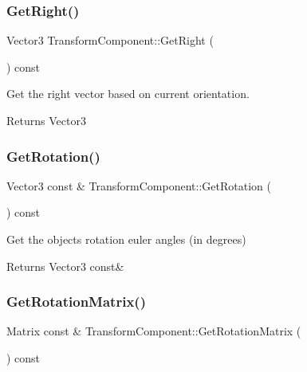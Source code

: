 \subsubsection{\texorpdfstring{Get\+Right()}{GetRight()}}
{\footnotesize\ttfamily Vector3 Transform\+Component\+::\+Get\+Right (\begin{DoxyParamCaption}{ }\end{DoxyParamCaption}) const}



Get the right vector based on current orientation. 

\begin{DoxyReturn}{Returns}
Vector3 
\end{DoxyReturn}
\mbox{\label{classTransformComponent_a66072d2fe63c96e8cded35fca0579400}} 
\subsubsection{\texorpdfstring{Get\+Rotation()}{GetRotation()}}
{\footnotesize\ttfamily Vector3 const  \& Transform\+Component\+::\+Get\+Rotation (\begin{DoxyParamCaption}{ }\end{DoxyParamCaption}) const}



Get the object\textquotesingle{}s rotation euler angles (in degrees) 

\begin{DoxyReturn}{Returns}
Vector3 const\& 
\end{DoxyReturn}
\mbox{\label{classTransformComponent_a95adaed6de8c45ab76479fe990dbb5cc}} 
\subsubsection{\texorpdfstring{Get\+Rotation\+Matrix()}{GetRotationMatrix()}}
{\footnotesize\ttfamily Matrix const  \& Transform\+Component\+::\+Get\+Rotation\+Matrix (\begin{DoxyParamCaption}{ }\end{DoxyParamCaption}) const}



